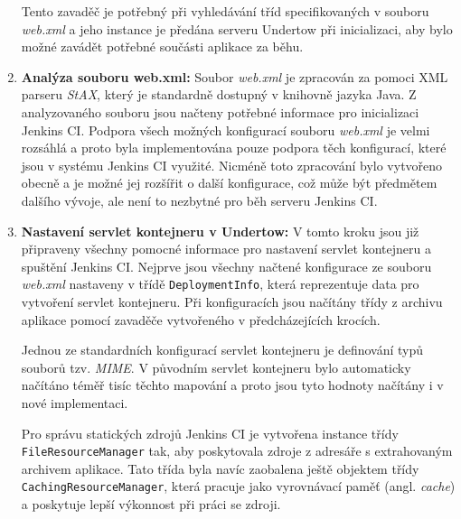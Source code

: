 \begin{enumerate}
                    Tento zavaděč je potřebný
                    při vyhledávání tříd specifikovaných v souboru \emph{web.xml} a jeho instance
                    je předána serveru Undertow při inicializaci, aby bylo možné zavádět
                    potřebné součásti aplikace za běhu.

                \item \textbf{Analýza souboru web.xml:} Soubor \emph{web.xml} je 
                    zpracován za pomoci XML parseru \emph{StAX}, který je standardně dostupný v knihovně
                    jazyka Java. Z analyzovaného souboru jsou načteny potřebné informace pro inicializaci
                    Jenkins CI. Podpora všech možných konfigurací souboru \emph{web.xml} je velmi rozsáhlá
                    a proto byla implementována pouze podpora těch konfigurací, které jsou
                    v systému Jenkins CI využité. Nicméně toto zpracování bylo vytvořeno obecně 
                    a je možné jej rozšířit o další konfigurace, což může být předmětem dalšího vývoje,
                    ale není to nezbytné pro běh serveru Jenkins CI.
                
                \item \textbf{Nastavení servlet kontejneru v Undertow:} V tomto kroku
                    jsou již připraveny všechny pomocné informace pro nastavení servlet kontejneru
                    a spuštění Jenkins CI. Nejprve jsou všechny načtené konfigurace ze souboru \emph{web.xml}
                    nastaveny v třídě \texttt{DeploymentInfo}, která reprezentuje data pro vytvoření servlet
                    kontejneru. Při konfiguracích jsou načítány třídy z archivu aplikace pomocí zavaděče vytvořeného
                    v předcházejících krocích.

                    Jednou ze standardních konfigurací servlet kontejneru je definování typů souborů tzv.
                    \emph{MIME}. V původním servlet kontejneru bylo automaticky načítáno téměř tisíc těchto mapování
                    a proto jsou tyto hodnoty načítány i v nové implementaci.
                    
                    Pro správu statických zdrojů Jenkins CI je vytvořena instance třídy \\\texttt{FileResourceManager}
                    tak, aby poskytovala zdroje z adresáře s extrahovaným archivem aplikace. Tato třída
                    byla navíc zaobalena ještě objektem třídy \\\texttt{CachingResourceManager}, která
                    pracuje jako vyrovnávací paměť (angl. \emph{cache}) a poskytuje lepší výkonnost
                    při práci se zdroji.



\end{enumerate}
